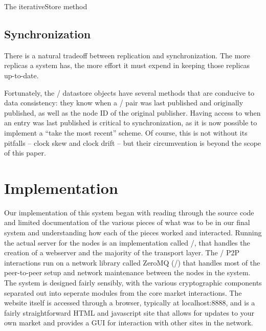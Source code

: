 \documentclass[11pt,twocolumn]{article}
\begin{document}
The {\sc iterativeStore} method %

\subsection{Synchronization}
There is a natural tradeoff between replication and synchronization.
The more replicas a system has, the more effort it must expend in keeping those replicas up-to-date.

Fortunately, the \Entangled/ datastore objects have several methods that are conducive to data consistency: they know when a \kv/ pair was last published and originally published, as well as the node ID of the original publisher.
Having access to when an entry was last published is critical to synchronization, as it is now possible to implement a ``take the most recent'' scheme.
Of course, this is not without its pitfalls -- clock skew and clock drift -- but their circumvention is beyond the scope of this paper.







\section{Implementation}
Our implementation of this system began with reading through the source code and limited documentation of the various pieces of what was to be in our final system and understanding how each of the pieces worked and interacted.
Running the actual server for the nodes is an implementation called \Tornado/, that handles the creation of a webserver and the majority of the transport layer.
The \OpenBazaar/ P2P interactions run on a network library called ZeroMQ (\ZMQ/) that handles most of the peer-to-peer setup and network maintenance between the nodes in the system.
The system is designed fairly sensibly, with the various cryptographic components separated out into seperate modules from the core market interactions.
The website itself is accessed through a browser, typically at {\sc localhost:8888}, and is a fairly straightforward HTML and javascript site that allows for updates to your own market and provides a GUI for interaction with other sites in the network.
\end{document}
